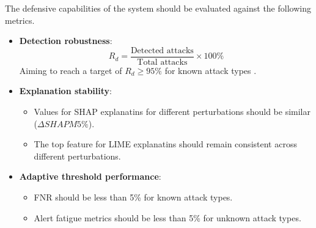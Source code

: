 \noindent The defensive capabilities of the system should be evaluated against the following metrics.

\begin{itemize}
  \item \textbf{Detection robustness}:
  \begin{equation}
    R_d = \frac{\text{Detected attacks}}{\text{Total attacks}} \times 100\%
  \end{equation}
  Aiming to reach a target of $R_d \geq 95\%$ for known attack types \citep{atlam2022business}.
  \item \textbf{Explanation stability}:
  \begin{itemize}
    \item Values for SHAP explanatins for different perturbations should be similar ($\Delta SHAP M 5\%$).
    \item The top feature for LIME explanatins should remain consistent across different perturbations.
  \end{itemize}
  \item \textbf{Adaptive threshold performance}:
  \begin{itemize}
    \item FNR should be less than 5\% for known attack types.
    \item Alert fatigue metrics should be less than 5\% for unknown attack types.
  \end{itemize}
\end{itemize}
